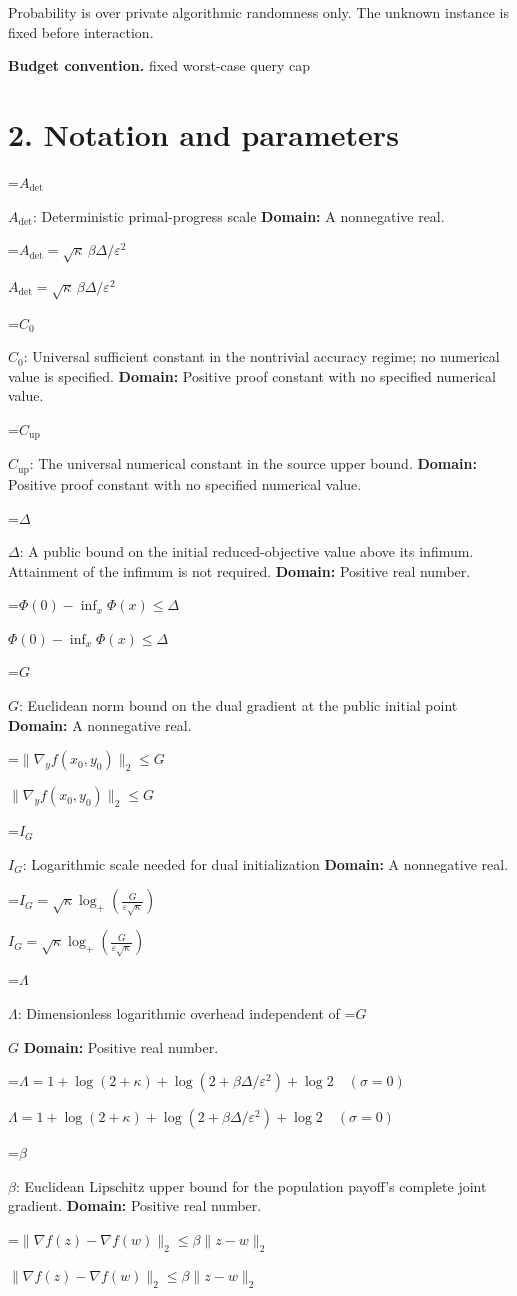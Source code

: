 \documentclass[10pt,a4paper]{article}
\newcommand{\AtlasMath}[1]{\par\begingroup\centering\setbox0=\hbox{$\displaystyle #1$}\ifdim\wd0>1.4\linewidth\typeout{ATLAS WIDE FORMULA: \the\wd0}\fi\ifdim\wd0>\linewidth\resizebox{\linewidth}{!}{\box0}\else\box0\fi\par\endgroup}
\newcommand{\AtlasInlineMath}[1]{\begingroup\setbox0=\hbox{$#1$}\ifdim\wd0>.4\linewidth\endgroup\AtlasMath{#1}\else\endgroup$#1$\fi}
\begin{document}
Probability is over private algorithmic randomness only. The unknown instance is fixed before interaction.

\textbf{Budget convention.} fixed worst-case query cap

\section{2. Notation and parameters}
\AtlasInlineMath{A_{\mathrm{det}}}: Deterministic primal-progress scale \textbf{Domain:} A nonnegative real.

\AtlasInlineMath{A_{\mathrm{det}}=\sqrt\kappa\,\beta\Delta/\varepsilon^2}

\AtlasInlineMath{C_0}: Universal sufficient constant in the nontrivial accuracy regime; no numerical value is specified. \textbf{Domain:} Positive proof constant with no specified numerical value.

\AtlasInlineMath{C_{\mathrm{up}}}: The universal numerical constant in the source upper bound. \textbf{Domain:} Positive proof constant with no specified numerical value.

\AtlasInlineMath{\Delta}: A public bound on the initial reduced-objective value above its infimum. Attainment of the infimum is not required. \textbf{Domain:} Positive real number.

\AtlasInlineMath{\Phi(0)-\inf_x\Phi(x)\le\Delta}

\AtlasInlineMath{G}: Euclidean norm bound on the dual gradient at the public initial point \textbf{Domain:} A nonnegative real.

\AtlasInlineMath{\|\nabla_yf(x_0,y_0)\|_2\le G}

\AtlasInlineMath{I_G}: Logarithmic scale needed for dual initialization \textbf{Domain:} A nonnegative real.

\AtlasInlineMath{I_G=\sqrt\kappa\log_+\!\left(\frac{G}{\varepsilon\sqrt\kappa}\right)}

\AtlasInlineMath{\Lambda}: Dimensionless logarithmic overhead independent of \AtlasInlineMath{G} \textbf{Domain:} Positive real number.

\AtlasInlineMath{\Lambda=1+\log(2+\kappa)+\log(2+\beta\Delta/\varepsilon^2)+\log2\quad(\sigma=0)}

\AtlasInlineMath{\beta}: Euclidean Lipschitz upper bound for the population payoff's complete joint gradient. \textbf{Domain:} Positive real number.

\AtlasInlineMath{\|\nabla f(z)-\nabla f(w)\|_2\le\beta\|z-w\|_2}
\end{document}
